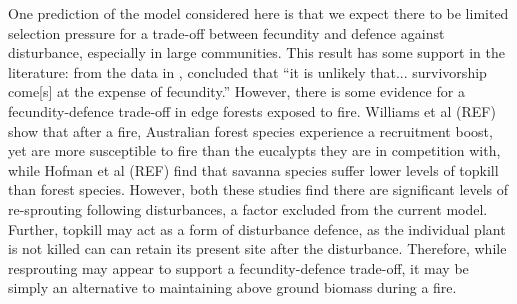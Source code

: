 \documentclass[a4paper]{article}
\begin{document}
One prediction of the model considered here is that we expect there to be limited selection pressure for a trade-off between fecundity and defence against disturbance, especially in large communities. This result has some support in the literature: from the data in \cite{martin2010dispersal}, \cite{martin2010divergence} concluded that ``it is unlikely that... survivorship come[s] at the expense of fecundity.'' However, there is some evidence for a fecundity-defence trade-off in edge forests exposed to fire. Williams et al (REF) show that after a fire, Australian forest species experience a recruitment boost, yet are more susceptible to fire than the eucalypts they are in competition with, while Hofman et al (REF) find that savanna species suffer lower levels of topkill than forest species. However, both these studies find there are significant levels of re-sprouting following disturbances, a factor excluded from the current model. Further, topkill may act as a form of disturbance defence, as the individual plant is not killed can can retain its present site after the disturbance. Therefore, while resprouting may appear to support a fecundity-defence trade-off, it may be simply an alternative to maintaining above ground biomass during a fire.
\end{document}
